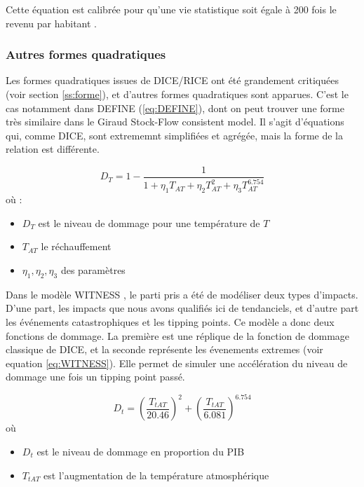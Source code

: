 Cette équation est calibrée pour qu'une vie statistique soit égale à 200 fois le revenu par habitant \cite{anthoff_fund_nodate}. 

\subsubsection{Autres formes quadratiques}

Les formes quadratiques issues de DICE/RICE ont été grandement critiquées (voir section \ref{ss:forme}), et d'autres formes quadratiques sont apparues. C'est le cas notamment dans DEFINE (\ref{eq:DEFINE}), dont on peut trouver une forme très similaire dans le Giraud Stock-Flow consistent model. Il s'agit d'équations qui, comme DICE, sont extrememnt simplifiées et agrégée, mais la forme de la relation est différente. 

\begin{equation}
    D_T = 1 - \frac{1}{1 + \eta_1 T_{AT} + \eta_2 T_{AT}^2 + \eta_3 T_{AT}^{6.754}}
    \label{eq:DEFINE}
\end{equation}
où : 

\begin{itemize}
    \item $D_T$ est le niveau de dommage pour une température de $T$
    \item $T_{AT}$ le réchauffement
    \item $\eta_1, \eta_2, \eta_3$ des paramètres
\end{itemize}

Dans le modèle WITNESS \cite{noauthor_witness_nodate}, le parti pris a été de modéliser deux types d'impacts. D'une part, les impacts que nous avons qualifiés ici de tendanciels, et d'autre part les événements catastrophiques et les tipping points. Ce modèle a donc deux fonctions de dommage. La première est une réplique de la fonction de dommage classique de DICE, et la seconde représente les évenements extremes (voir equation \ref{eq:WITNESS}). Elle permet de simuler une accélération du niveau de dommage une fois un tipping point passé. 

\begin{equation}
    D_t=\left(\frac{T_{t A T}}{20.46}\right)^2+\left(\frac{T_{t A T}}{6.081}\right)^{6.754}
    \label{eq:WITNESS}
\end{equation}
où 
\begin{itemize}
    \item $D_t$ est le niveau de dommage en proportion du PIB
    \item $T_{tAT}$ est l'augmentation de la température atmosphérique
\end{itemize}

